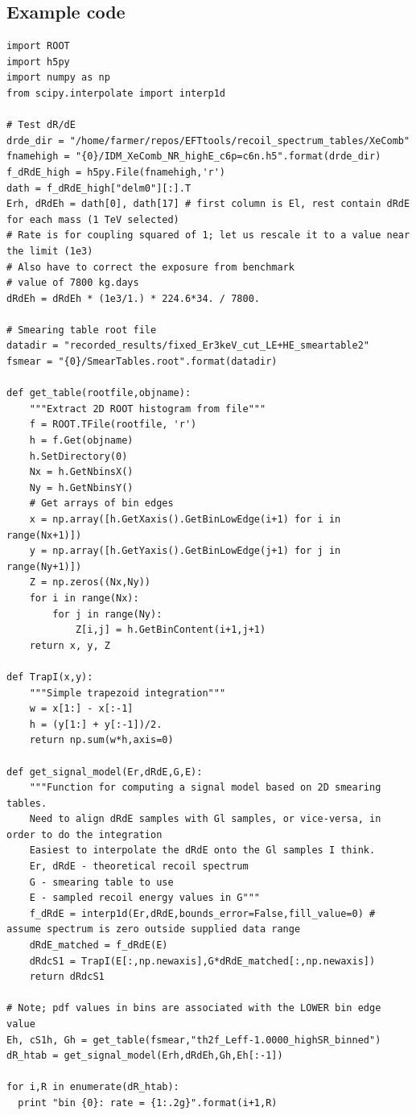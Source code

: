 \subsection{Example code}
\label{app:example_code}
\begin{lstlisting}
import ROOT
import h5py
import numpy as np
from scipy.interpolate import interp1d

# Test dR/dE
drde_dir = "/home/farmer/repos/EFTtools/recoil_spectrum_tables/XeComb"
fnamehigh = "{0}/IDM_XeComb_NR_highE_c6p=c6n.h5".format(drde_dir)
f_dRdE_high = h5py.File(fnamehigh,'r')
dath = f_dRdE_high["delm0"][:].T
Erh, dRdEh = dath[0], dath[17] # first column is El, rest contain dRdE for each mass (1 TeV selected)
# Rate is for coupling squared of 1; let us rescale it to a value near the limit (1e3)
# Also have to correct the exposure from benchmark
# value of 7800 kg.days
dRdEh = dRdEh * (1e3/1.) * 224.6*34. / 7800.

# Smearing table root file
datadir = "recorded_results/fixed_Er3keV_cut_LE+HE_smeartable2"
fsmear = "{0}/SmearTables.root".format(datadir)

def get_table(rootfile,objname):
    """Extract 2D ROOT histogram from file""" 
    f = ROOT.TFile(rootfile, 'r')
    h = f.Get(objname)
    h.SetDirectory(0)
    Nx = h.GetNbinsX()
    Ny = h.GetNbinsY()
    # Get arrays of bin edges
    x = np.array([h.GetXaxis().GetBinLowEdge(i+1) for i in range(Nx+1)])
    y = np.array([h.GetYaxis().GetBinLowEdge(j+1) for j in range(Ny+1)])
    Z = np.zeros((Nx,Ny))
    for i in range(Nx):
        for j in range(Ny):
            Z[i,j] = h.GetBinContent(i+1,j+1)
    return x, y, Z

def TrapI(x,y):
    """Simple trapezoid integration"""
    w = x[1:] - x[:-1]
    h = (y[1:] + y[:-1])/2.
    return np.sum(w*h,axis=0)

def get_signal_model(Er,dRdE,G,E):
    """Function for computing a signal model based on 2D smearing tables.
    Need to align dRdE samples with Gl samples, or vice-versa, in order to do the integration
    Easiest to interpolate the dRdE onto the Gl samples I think.
    Er, dRdE - theoretical recoil spectrum
    G - smearing table to use
    E - sampled recoil energy values in G"""
    f_dRdE = interp1d(Er,dRdE,bounds_error=False,fill_value=0) # assume spectrum is zero outside supplied data range
    dRdE_matched = f_dRdE(E)
    dRdcS1 = TrapI(E[:,np.newaxis],G*dRdE_matched[:,np.newaxis])
    return dRdcS1

# Note; pdf values in bins are associated with the LOWER bin edge value
Eh, cS1h, Gh = get_table(fsmear,"th2f_Leff-1.0000_highSR_binned")
dR_htab = get_signal_model(Erh,dRdEh,Gh,Eh[:-1]) 

for i,R in enumerate(dR_htab):
  print "bin {0}: rate = {1:.2g}".format(i+1,R)
\end{lstlisting}

